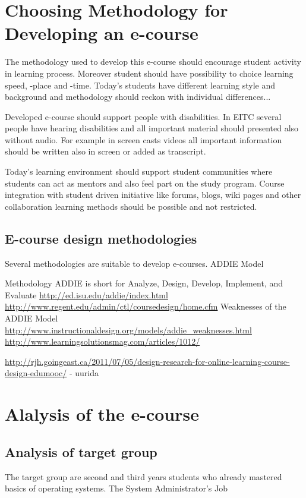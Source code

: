 \section{Choosing Methodology for Developing an e-course}



The methodology used to develop this e-course should encourage student activity in learning process. Moreover student should have possibility to choice learning speed, -place and -time. Today's students have different learning style and background and methodology should reckon with individual differences...

Developed e-course should support people with disabilities. In \gls{EITC} several people have hearing disabilities and all important material should presented also without audio. For example in screen casts videos all important information should be written also in screen or added as transcript.

Today’s learning environment should support student communities where students can act as mentors and also feel part on the study program. Course integration with student driven initiative like forums, blogs, wiki pages and other collaboration learning methods should be possible and not restricted.

\subsection{E-course design methodologies}

Several methodologies are suitable to develop e-courses. \gls{ADDIE Model}

Methodology 
ADDIE is short for Analyze, Design, Develop, Implement, and Evaluate \url{http://ed.isu.edu/addie/index.html}
\url{http://www.regent.edu/admin/ctl/coursedesign/home.cfm}
Weaknesses of the ADDIE Model \url{http://www.instructionaldesign.org/models/addie_weaknesses.html}
\url{http://www.learningsolutionsmag.com/articles/1012/}

\url{http://rjh.goingeast.ca/2011/07/05/design-research-for-online-learning-course-design-edumooc/} - uurida

\section{Alalysis of the e-course}
\subsection{Analysis of target group}
The target group are second and third years students who already mastered basics of operating systems.
The System Administrator's Job

